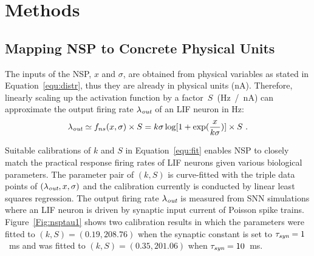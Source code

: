 \documentclass[10pt,journal,compsoc]{IEEEtran}
\begin{document}
	
	\section{Methods}	
	\label{sec:meth}
	
	\subsection{Mapping NSP to Concrete Physical Units}
	\label{sec:af_model}
	The inputs of the NSP, $x$ and $\sigma$, are obtained from physical variables as stated in Equation~\ref{equ:distr}, thus they are already in physical units (nA).
	Therefore, linearly scaling up the activation function by a factor~$S$~(Hz~/~nA) can approximate the output firing rate $\lambda_{\textit{\textrm{out}}}$ of an LIF neuron in Hz:
	\begin{equation}
	\lambda_{\textit{\textrm{out}}} \simeq f_{ns}(x, \sigma) \times S = k \sigma \log [1 + \exp(\frac{x}{k \sigma})] \times S~.
	\label{equ:fit}
	\end{equation}	
	
	
	Suitable calibrations of $k$ and $S$ in Equation~\ref{equ:fit} enables NSP to closely match the practical response firing rates of LIF neurons given various biological parameters.
	The parameter pair of $(k, S)$ is curve-fitted with the triple data points of $(\lambda_{\textit{\textrm{out}}}, x, \sigma)$ and the calibration currently is conducted by linear least squares regression.
	The output firing rate $\lambda_{\textit{\textrm{out}}}$ is measured from SNN simulations where an LIF neuron is driven by synaptic input current of Poisson spike trains.
	Figure~\ref{Fig:nsptau1} shows two calibration results in which the parameters were fitted to $(k, S)=(0.19,208.76)$ when the synaptic constant is set to $\tau_{\textit{\textrm{syn}}}=1$~ms and was fitted to $(k, S)=(0.35,201.06)$ when $\tau_{\textit{\textrm{syn}}}=10$~ms.
	
\end{document}
